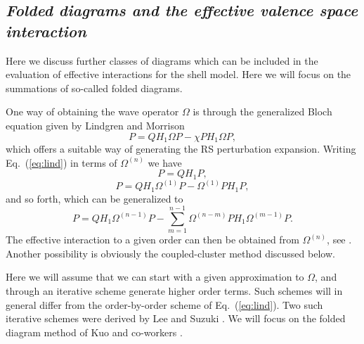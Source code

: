 \documentclass[twoside,12pt]{article}
\begin{document}
\subsection{\it Folded diagrams and the effective valence space interaction}

Here we discuss further classes of diagrams
which can be included in the evaluation of effective interactions
for the shell model.
Here we will focus on the summations of so-called folded
diagrams.

One way of obtaining the wave operator
$\Omega$ is through the generalized Bloch
equation given by Lindgren and Morrison \cite{lm85}
\begin{equation}
[\Omega, H_0]P=QH_1\Omega P-\chi PH_1\Omega P,
\label{eq:lind}
\end{equation}
which offers a suitable way of generating the RS perturbation expansion.
Writing Eq.\ (\ref{eq:lind}) in terms of $\Omega^{(n)}$ we have
\begin{equation}
[\Omega^{(1)}, H_0]P=QH_1P,
\end{equation}
\begin{equation}
[\Omega^{(2)}, H_0]P=QH_1\Omega^{(1)} P- \Omega^{(1)} PH_1P,
\end{equation}
and so forth,  which can be generalized to
\begin{equation}
[\Omega^{(n)}, H_0]P=QH_1\Omega^{(n-1)} P- \sum_{m=1}^{n-1}
\Omega^{(n-m)} PH_1\Omega^{(m-1)}P.
\end{equation}
The effective interaction to a given order can then be obtained from
$\Omega^{(n)}$, see \cite{lm85}.
Another possibility is obviously the coupled-cluster method discussed
below.

Here we will assume that we can start with a given
approximation to $\Omega$, and through an iterative scheme generate
higher order terms. Such schemes will in general differ from the
order-by-order scheme of Eq.\ (\ref{eq:lind}).  Two such iterative
schemes were derived  by Lee and Suzuki \cite{ls80}. We will focus
on the folded diagram method of Kuo and co-workers \cite{ko90}.
\end{document}
